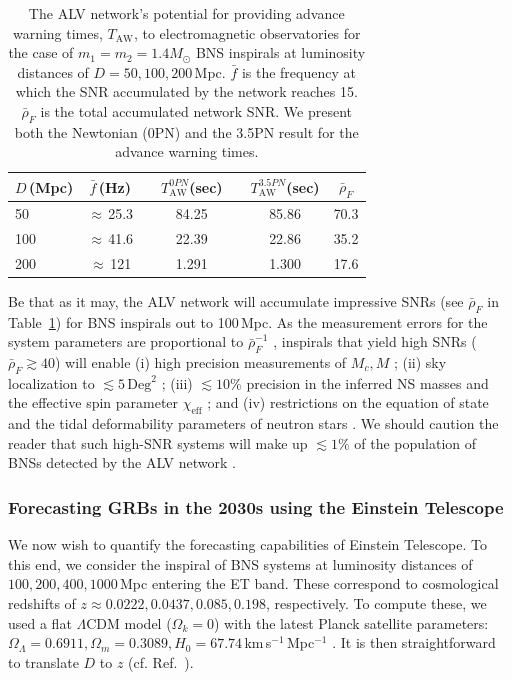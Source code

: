 \documentclass[prd,amsmath,amssymb,aps,floats,amsfonts,notitlepage,superscriptaddress,eqsecnum,nofootinbib,10pt]{revtex4-1}
\newcommand\T{\rule{0pt}{2.6ex}}       %
\newcommand\B{\rule[-1.2ex]{0pt}{0pt}} %
\begin{document}
\begin{table}[h]
\centering
\begin{tabular}{lcccccc}
\hline
$D\,$(Mpc) & $\bar{f}\,$(Hz) &{}& $T^{0PN}_\text{AW}$(sec) &\hspace{1mm} & $T^{3.5PN}_\text{AW}$(sec)& $\bar{\rho}_F$\T\B\\
\hline
50 & $\approx\,$25.3 & & 84.25 & & 85.86 & 70.3 \T\\
100 & $\approx\,$41.6 & & 22.39 & & 22.86 & 35.2 \\
200 & $\approx\,$121 & & 1.291 &\quad & 1.300 & 17.6 \\
\hline
\end{tabular}
\caption{The ALV network's potential for providing advance warning times, $T_\text{AW}$, 
to electromagnetic observatories for the case of $m_1=m_2=1.4 M_\odot$ BNS inspirals at luminosity distances of $D=50,100,200\,$Mpc. 
$\bar{f}$ is the frequency at which the  %
SNR accumulated by the network reaches 15. 
$\bar{\rho}_F$ is the total accumulated network SNR. %
We present both the Newtonian (0PN) 
and the 3.5PN result for the advance warning times.}\label{table:LIGO2020}
\end{table}
%
%
Be that as it may,
the ALV network will accumulate impressive SNRs 
(see $\bar{\rho}_F$ in Table~\ref{table:LIGO2020}) for BNS inspirals out to 100\,Mpc.
As the measurement errors for the system parameters are proportional to $\bar\rho^{-1}_F$ \cite{Cutler:1994ys},
inspirals that yield high SNRs ($\bar\rho_F\gtrsim 40$) will enable (i) high precision measurements of 
$M_c, M$ \cite{Farr:2015lna}; (ii) sky localization to $\lesssim 5\,\text{Deg}^2$ \cite{Rodriguez:2013oaa};
(iii) $ \lesssim 10\%$ precision in the inferred NS masses \cite{Rodriguez:2013oaa} and the effective spin parameter $\chi_\text{eff}$ \cite{Zhu:2017znf}; and
(iv) restrictions on the equation of state and the tidal deformability
parameters of neutron stars \cite{Read:2009yp, Andersson:2009yt, PhysRevD.89.103012, PhysRevD.91.043002}.
We should caution the reader that such high-SNR systems will make up $\lesssim 1\%$ of the population of BNSs detected by 
the ALV network \cite{Sathyaprakash:2012jk}.

\subsubsection{Forecasting GRBs in the 2030s using the Einstein Telescope}\label{Sec:ETB}
We now wish to quantify the forecasting capabilities of Einstein Telescope. To this end, we consider the inspiral of BNS systems
at luminosity distances of $100,200,400,1000\,$Mpc entering the ET band. 
These correspond to cosmological redshifts of $z\approx 0.0222,0.0437, 0.085, 0.198$, respectively.
To compute these, we used a flat $\Lambda$CDM model ($\Omega_k=0$) with the latest Planck satellite parameters: 
$\Omega_\Lambda = 0.6911, \Omega_m = 0.3089, H_0 = 67.74\,$km\,s$^{-1}\,$Mpc$^{-1}$ \cite{Planck2015}. %
It is then straightforward to translate $D$ to $z$ (cf. Ref.~\cite{Hogg:1999ad}).
\end{document}
